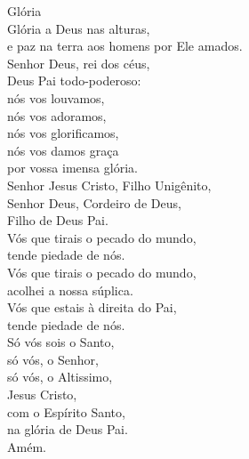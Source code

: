 \textcolor{VioletRed1}{Glória}
\vspace{0.2cm} \\
Glória a Deus nas alturas, \\
e paz na terra aos homens por Ele amados. \\
Senhor Deus, rei dos céus, \\
Deus Pai todo-poderoso: \\
nós vos louvamos, \\
nós vos adoramos, \\
nós vos glorificamos, \\
nós vos damos graça \\
por vossa imensa glória. \\
Senhor Jesus Cristo, Filho Unigênito, \\
Senhor Deus, Cordeiro de Deus, \\
Filho de Deus Pai. \\
Vós que tirais o pecado do mundo, \\
tende piedade de nós. \\
Vós que tirais o pecado do mundo, \\
acolhei a nossa súplica. \\
Vós que estais à direita do Pai, \\
tende piedade de nós. \\
Só vós sois o Santo, \\
só vós, o Senhor, \\
só vós, o Altissimo, \\
Jesus Cristo, \\
com o Espírito Santo, \\
na glória de Deus Pai. \\
Amém.
\vspace{0.2cm} \\
